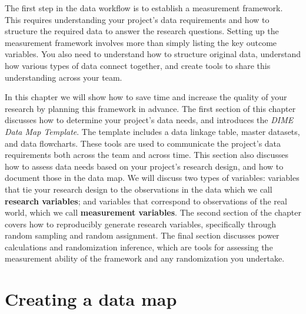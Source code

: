 
\begin{fullwidth}
The first step in the data workflow is to establish a measurement framework.
This requires understanding your project's data requirements
and how to structure the required data to answer the research questions.
Setting up the measurement framework involves more than
simply listing the key outcome variables.
You also need to understand how to structure original data,
understand how various types of data connect together,
and create tools to share this understanding across your team.

In this chapter we will show how to save time
and increase the quality of your research by
planning this framework in advance.
The first section of this chapter discusses how to
determine your project's data needs,
and introduces the \textit{DIME Data Map Template}.
The template includes a data linkage table,
master datasets, and data flowcharts.
These tools are used to communicate the project's data requirements
both across the team and across time.
This section also discusses how to assess data needs
based on your project's research design,
and how to document those in the data map.
We will discuss two types of variables:
variables that tie your research design
to the observations in the data
which we call \textbf{research variables};
and variables that correspond to observations of the real world,
which we call \textbf{measurement variables}.
The second section of the chapter covers how to reproducibly generate research variables,
specifically through random sampling and random assignment.
The final section discusses power calculations and randomization inference,
which are tools for assessing the measurement ability of
the framework and any randomization you undertake.


\end{fullwidth}


\section{Creating a data map}

